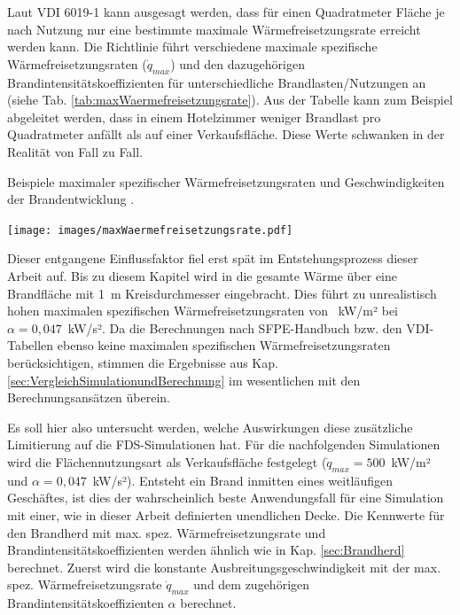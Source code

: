 Laut VDI 6019-1 kann ausgesagt werden, dass für einen Quadratmeter Fläche je nach Nutzung nur eine bestimmte maximale Wärmefreisetzungsrate erreicht werden kann. Die Richtlinie führt verschiedene maximale spezifische Wärmefreisetzungsraten ($\Dot{q}_{max}$) und den dazugehörigen Brandintensitätskoeffizienten für unterschiedliche Brandlasten/Nutzungen an (siehe Tab. \ref{tab:maxWaermefreisetzungsrate}). Aus der Tabelle kann zum Beispiel abgeleitet werden, dass in einem Hotelzimmer weniger Brandlast pro Quadratmeter anfällt als auf einer Verkaufsfläche. Diese Werte schwanken in der Realität von Fall zu Fall.  
\begin{table}[b]
    \caption{Beispiele maximaler spezifischer Wärmefreisetzungsraten und Geschwindigkeiten der Brandentwicklung \cite{VDI6019B1}.}
    \centering
    \texttt{[image: images/maxWaermefreisetzungsrate.pdf]}
    \label{tab:maxWaermefreisetzungsrate}
\end{table}
Dieser entgangene Einflussfaktor fiel erst spät im Entstehungsprozess dieser Arbeit auf. Bis zu diesem Kapitel wird in die gesamte Wärme über eine Brandfläche mit 1~m Kreisdurchmesser eingebracht. Dies führt zu unrealistisch hohen maximalen spezifischen Wärmefreisetzungsraten von ~kW/m² bei $\alpha=0{,}047$~kW/s². 
Da die Berechnungen nach SFPE-Handbuch bzw. den VDI-Tabellen ebenso keine maximalen spezifischen Wärmefreisetzungsraten berücksichtigen, stimmen die Ergebnisse aus Kap. \ref{sec:VergleichSimulationundBerechnung} im wesentlichen mit den Berechnungsansätzen überein. 

Es soll hier also untersucht werden, welche Auswirkungen diese zusätzliche Limitierung auf die FDS-Simulationen hat. Für die nachfolgenden Simulationen wird die Flächennutzungsart als Verkaufsfläche festgelegt ($\Dot{q}_{max}=500$~kW/m² und $\alpha=0{,}047$~kW/s²). Entsteht ein Brand inmitten eines weitläufigen Geschäftes, ist dies der wahrscheinlich beste Anwendungsfall für eine Simulation mit einer, wie in dieser Arbeit definierten unendlichen Decke. 
Die Kennwerte für den Brandherd mit max. spez. Wärmefreisetzungsrate und Brand\-in\-ten\-si\-täts\-ko\-ef\-fi\-zien\-ten werden ähnlich wie in Kap. \ref{sec:Brandherd} berechnet. Zuerst wird die konstante Ausbreitungsgeschwindigkeit mit der max. spez. Wärmefreisetzungsrate $\Dot{q}_{max}$ und dem zugehörigen Brandintensitätskoeffizienten $\alpha$ berechnet. 

